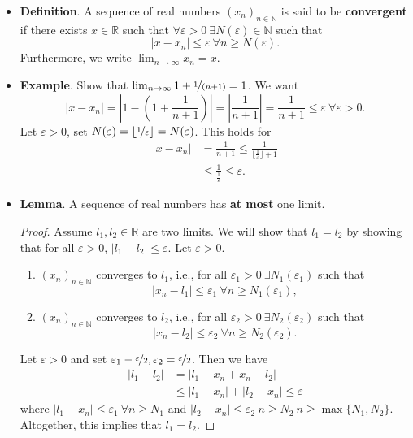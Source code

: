 \documentclass{article}
\newcommand{\R}{\mathbb{R}}
\newcommand{\N}{\mathbb{N}}
\newcommand{\seq}[2]{(#1_{#2})_{#2 \in \N}}
\newcommand{\?}{\stackrel{?}{=}}
\begin{document}
\begin{itemize}
    \item \textbf{Definition}. A sequence of real numbers $\seq{x}{n}$ is said to be \textbf{convergent} if there exists $x \in \R$ such that $\forall \varepsilon > 0 \ \exists N(\varepsilon) \in \N$ such that
    $$|x - x_n| \leq \varepsilon \ \forall n \geq N(\varepsilon).$$
    Furthermore, we write $\lim_{n \to \infty} x_n = x$.
    \item \textbf{Example}. Show that $\lim_{n \to \infty} 1 + \nicefrac{1}{(n + 1)} = 1$. We want
    $$|x - x_n| = \left|1 - \left(1 + \frac{1}{n + 1}\right)\right| = \left|\frac{1}{n + 1}\right| = \frac{1}{n + 1} \leq \varepsilon \ \forall \varepsilon > 0.$$
    Let $\varepsilon > 0$, set $N(\varepsilon) = \lfloor \nicefrac{1}{\varepsilon} \rfloor = N(\varepsilon)$. This holds for
    \begin{align*}
        |x - x_n| &= \frac{1}{n + 1} \leq \frac{1}{\lfloor \frac{1}{\varepsilon} \rfloor + 1} \\
        &\leq \frac{1}{\frac{1}{\varepsilon}} \leq \varepsilon.
    \end{align*}
    \item \textbf{Lemma}. A sequence of real numbers has \textbf{at most} one limit.
    \begin{proof}
        Assume $l_1, l_2 \in \R$ are two limits. We will show that $l_1 = l_2$ by showing that for all $\varepsilon > 0$, $|l_1 - l_2| \leq \varepsilon$. Let $\varepsilon > 0$.
        \begin{enumerate}[label=(\arabic*)]
            \item $\seq{x}{n}$ converges to $l_1$, i.e., for all $\varepsilon_1 > 0 \ \exists N_1(\varepsilon_1)$ such that
            $$|x_n - l_1| \leq \varepsilon_1 \ \forall n \geq N_1(\varepsilon_1),$$
            \item $\seq{x}{n}$ converges to $l_2$, i.e., for all $\varepsilon_2 > 0 \ \exists N_2(\varepsilon_2)$ such that
            $$|x_n - l_2| \leq \varepsilon_2 \ \forall n \geq N_2(\varepsilon_2).$$
        \end{enumerate}
        Let $\varepsilon > 0$ and set $\varepsilon_1 - \nicefrac{\varepsilon}{2}, \varepsilon_2 = \nicefrac{\varepsilon}{2}$. Then we have
        \begin{align*}
            |l_1 - l_2| &= |l_1 - x_n + x_n - l_2| \\
            &\leq |l_1 - x_n| + |l_2 - x_n| \leq \varepsilon
        \end{align*}
        where $|l_1 - x_n| \leq \varepsilon_1 \ \forall n \geq N_1$ and $|l_2 - x_n| \leq \varepsilon_2 \  n \geq N_2 \ n \geq \max\{N_1, N_2\}$. Altogether, this implies that $l_1 = l_2$.

\end{proof}
\end{itemize}
\end{document}
